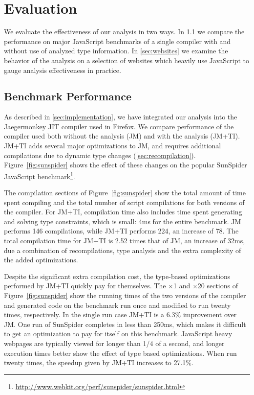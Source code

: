 \section{Evaluation}
\label{sec:evaluation}

We evaluate the effectiveness of our analysis in two ways.
In \Section\ref{sec:benchmarks} we compare the performance on major JavaScript benchmarks
of a single compiler with and without use of analyzed type information.
In \Section\ref{sec:websites} we examine the behavior of the analysis on a selection of
websites which heavily use JavaScript to gauge analysis effectiveness in practice.

\subsection{Benchmark Performance}
\label{sec:benchmarks}


As described in \Section\ref{sec:implementation}, we have integrated our analysis into
the Jaegermonkey JIT compiler used in Firefox.
We compare performance of the compiler used both without the analysis (JM)
and with the analysis (JM+TI).
JM+TI adds several major optimizations to JM,
and requires additional compilations due to dynamic type changes
(\Section\ref{sec:recompilation}).
Figure~\ref{fig:sunspider} shows the effect of these changes on the popular
SunSpider JavaScript benchmark\footnote{\url{http://www.webkit.org/perf/sunspider/sunspider.html}}.

The compilation sections of Figure~\ref{fig:sunspider} show the total amount of time
spent compiling and the total number of script compilations for both versions of
the compiler.
For JM+TI, compilation time also includes time spent generating and solving
type constraints, which is small: 4ms for the entire benchmark.
JM performs 146 compilations, while JM+TI performs 224, an increase of 78.
The total compilation time for JM+TI is 2.52 times that of JM, an increase
of 32ms, due a combination of recompilations, type analysis and the extra
complexity of the added optimizations.

Despite the significant extra compilation cost, the type-based optimizations
performed by JM+TI quickly pay for themselves. The $\times$1 and
$\times$20 sections
of Figure~\ref{fig:sunspider} show the running times of the two versions of the
compiler and generated code on the benchmark run once and modified
to run twenty times, respectively.
In the single run case JM+TI is a 6.3\% improvement over JM.
One run of SunSpider completes in less than 250ms, which makes it
difficult to get an optimization to pay for itself on this benchmark.
JavaScript heavy webpages are typically viewed for longer than
1/4 of a second, and longer execution times better show the effect
of type based optimizations.
When run twenty times, the speedup given by JM+TI increases to 27.1\%.

